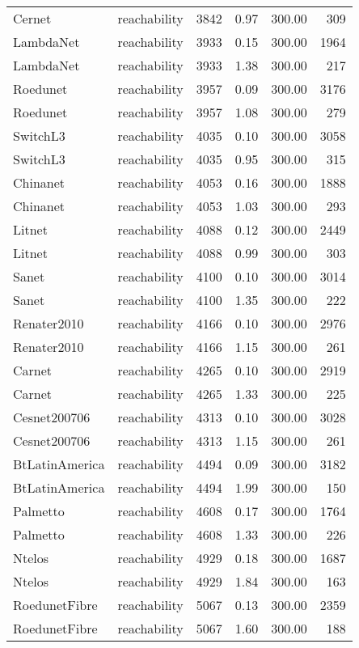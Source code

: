 \begin{tabular}{llrrrr}
Cernet & reachability & 3842 & 0.97 & 300.00 & 309 \\
LambdaNet & reachability & 3933 & 0.15 & 300.00 & 1964 \\
LambdaNet & reachability & 3933 & 1.38 & 300.00 & 217 \\
Roedunet & reachability & 3957 & 0.09 & 300.00 & 3176 \\
Roedunet & reachability & 3957 & 1.08 & 300.00 & 279 \\
SwitchL3 & reachability & 4035 & 0.10 & 300.00 & 3058 \\
SwitchL3 & reachability & 4035 & 0.95 & 300.00 & 315 \\
Chinanet & reachability & 4053 & 0.16 & 300.00 & 1888 \\
Chinanet & reachability & 4053 & 1.03 & 300.00 & 293 \\
Litnet & reachability & 4088 & 0.12 & 300.00 & 2449 \\
Litnet & reachability & 4088 & 0.99 & 300.00 & 303 \\
Sanet & reachability & 4100 & 0.10 & 300.00 & 3014 \\
Sanet & reachability & 4100 & 1.35 & 300.00 & 222 \\
Renater2010 & reachability & 4166 & 0.10 & 300.00 & 2976 \\
Renater2010 & reachability & 4166 & 1.15 & 300.00 & 261 \\
Carnet & reachability & 4265 & 0.10 & 300.00 & 2919 \\
Carnet & reachability & 4265 & 1.33 & 300.00 & 225 \\
Cesnet200706 & reachability & 4313 & 0.10 & 300.00 & 3028 \\
Cesnet200706 & reachability & 4313 & 1.15 & 300.00 & 261 \\
BtLatinAmerica & reachability & 4494 & 0.09 & 300.00 & 3182 \\
BtLatinAmerica & reachability & 4494 & 1.99 & 300.00 & 150 \\
Palmetto & reachability & 4608 & 0.17 & 300.00 & 1764 \\
Palmetto & reachability & 4608 & 1.33 & 300.00 & 226 \\
Ntelos & reachability & 4929 & 0.18 & 300.00 & 1687 \\
Ntelos & reachability & 4929 & 1.84 & 300.00 & 163 \\
RoedunetFibre & reachability & 5067 & 0.13 & 300.00 & 2359 \\
RoedunetFibre & reachability & 5067 & 1.60 & 300.00 & 188 \\

\end{tabular}
